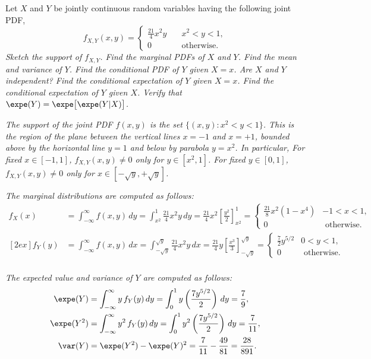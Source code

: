 \begin{exercise}
\begin{questions}
\question
Let $X$ and $Y$ be jointly continuous random variables having the following joint PDF,
\[
f_{X,Y}(x,y) = 
\begin{cases}
	\frac{21}{4}x^2y		& \quad x^2<y<1, \\
	0						& \quad\text{otherwise.}
\end{cases}
\]
\ben
\it Sketch the support of $f_{X,Y}$.
\it Find the marginal PDFs of $X$ and $Y$.
\it Find the mean and variance of $Y$.
\it Find the conditional PDF of $Y$ given $X=x$. 
\it Are $X$ and $Y$ independent? 
\it Find the conditional expectation of $Y$ given $X=x$. 
\it Find the conditional expectation of $Y$ given $X$. 
\it Verify that $\expe(Y)=\expe\big[\expe(Y|X)\big]$.
\een

\begin{answer}
\ben
\it %
The support of the joint PDF $f(x,y)$ is the set $\{(x,y): x^2 < y < 1\}$.  This is the region of the plane between the vertical lines $x=-1$ and $x=+1$, bounded above by the horizontal line $y=1$ and below by parabola $y=x^2$. In particular,
\bit
\it For fixed $x\in[-1,1]$, $f_{X,Y}(x,y)\neq 0$ only for $y\in[x^2,1]$.
\it For fixed $y\in[0,1]$, $f_{X,Y}(x,y)\neq 0$ only for $x\in[-\sqrt{y},+\sqrt{y}]$.
\eit

\it %
The marginal distributions are computed as follows:
\begin{align*}
f_X(x) 	
	& = \int_{-\infty}^{\infty} f(x,y)\,dy 
	= \int_{x^2}^1 \frac{21}{4}x^2y\,dy 
	= \frac{21}{4}x^2\left[\frac{y^2}{2}\right]_{x^2}^1 
	= \begin{cases} \frac{21}{8}x^2(1-x^4)	& -1<x<1, \\ 0 & \text{ otherwise.}\end{cases} \\ [2ex]
f_Y(y) 	
	& = \int_{-\infty}^{\infty} f(x,y)\,dx 
	= \int_{-\sqrt{y}}^{\sqrt{y}} \frac{21}{4}x^2y\,dx 
	= \frac{21}{4}y\left[\frac{x^3}{3}\right]_{-\sqrt{y}}^{\sqrt{y}}
	= \begin{cases} \frac{7}{2}y^{5/2} & 0< y< 1, \\ 0 & \text{ otherwise.}\end{cases} \\
\end{align*}

\it %
The expected value and variance of $Y$ are computed as follows:
\begin{align*}
\expe(Y)
	& = \int_{-\infty}^{\infty} y\,f_Y(y)\,dy 	= \int_0^1 y\left(\frac{7y^{5/2}}{2}\right)\,dy = \frac{7}{9}, \\
\expe(Y^2)
	& = \int_{-\infty}^{\infty} y^2\,f_Y(y)\,dy = \int_0^1 y^2\left(\frac{7y^{5/2}}{2}\right)\,dy = \frac{7}{11}, \\
\var(Y)
	& = \expe(Y^2) - \expe(Y)^2 = \frac{7}{11} - \frac{49}{81} = \frac{28}{891}.
\end{align*}


\end{answer}
\end{questions}
\end{exercise}
